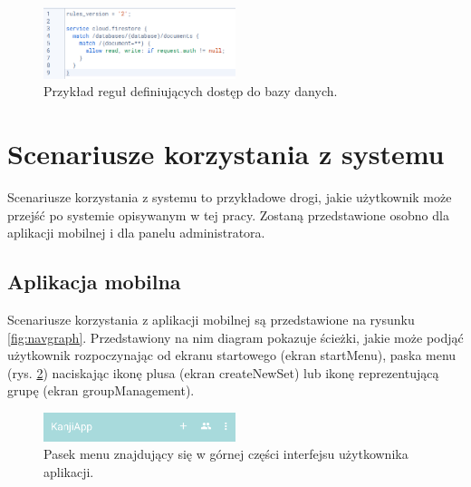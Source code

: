 \documentclass[a4paper,twoside,12pt]{book}
\begin{document}
\begin{figure}[]
\centering
\includegraphics[width=0.5\textwidth]{Firestore}
\caption{Przykład reguł definiujących dostęp do bazy danych.}
\label{fig:rules}
\end{figure}

\section{Scenariusze korzystania z systemu}

Scenariusze korzystania z systemu to przykładowe drogi, jakie użytkownik może przejść po systemie opisywanym w tej pracy. Zostaną przedstawione osobno dla aplikacji mobilnej i dla panelu administratora.

\subsection{Aplikacja mobilna}

Scenariusze korzystania z aplikacji mobilnej są przedstawione na rysunku \ref{fig:navgraph}. Przedstawiony na nim diagram pokazuje ścieżki, jakie może podjąć użytkownik rozpoczynając od ekranu startowego (ekran startMenu), paska menu (rys. \ref{fig:menu}) naciskając ikonę plusa (ekran createNewSet) lub ikonę reprezentującą grupę (ekran groupManagement). 

\begin{figure}[]
\centering
\includegraphics[width=0.5\textwidth]{menu}
\caption{Pasek menu znajdujący się w górnej części interfejsu użytkownika aplikacji.}
\label{fig:menu}
\end{figure}
\end{document}
